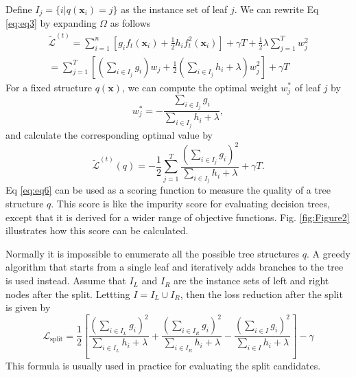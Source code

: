 \documentclass[sigconf]{acmart}
\begin{document}
Define $I_j = \{i|q(\mathbf{x}_i) = j\}$ as the instance set of leaf $j$. We
can rewrite Eq \eqref{eq:eq3} by expanding $\Omega$ as follows
\begin{equation}
    \begin{split}
        \tilde{\mathcal{L}}^{(t)} = \sum_{i=1}^{n}[g_if_t(\mathbf{x}_i) + \frac{1}{2}h_if_{t}^{2}(\mathbf{x}_i)] + \gamma T + \frac{1}{2}\lambda \sum_{j=1}^{T}w_{j}^{2} \\
        = \sum_{j=1}^{T}[(\sum_{i \in I_j}g_i)w_j + \frac{1}{2}(\sum_{i \in I_j}h_i + \lambda)w_{j}^{2}] + \gamma T
    \end{split}
    \label{eq:eq4}
\end{equation}
For a fixed structure $q(\mathbf{x})$, we can compute the optimal
weight $w_{j}^{*}$ of leaf $j$ by
\begin{equation}
    w_{j}^{*} = - \frac{\sum_{i \in I_j}g_i}{\sum_{i \in I_j}h_i + \lambda},
    \label{eq:eq5}
\end{equation}
and calculate the corresponding optimal value by
\begin{equation}
    \tilde{\mathcal{L}}^{(t)}(q) = - \frac{1}{2}\sum_{j=1}^{T}\frac{(\sum_{i \in I_j}g_i)^2}{\sum_{i \in I_j}h_i + \lambda} + \gamma T.
    \label{eq:eq6}
\end{equation}
Eq \eqref{eq:eq6} can be used as a scoring function to measure the quality of a tree structure $q$. This score is like the 
impurity score for evaluating decision trees, except that it is derived for a wider range of objective functions. Fig. 
\ref{fig:Figure2} illustrates how this score can be calculated.

Normally it is impossible to enumerate all the possible tree structures $q$. A greedy algorithm that starts from a
single leaf and iteratively adds branches to the tree is used instead. Assume that $I_L$ and $I_R$ are the instance sets of 
left and right nodes after the split. Lettting $I = I_L \cup I_R$, then the loss reduction after the split is given by
\begin{equation}
    \mathcal{L}_\text{split} = \frac{1}{2} \left[\frac{(\sum_{i \in I_L}g_i)^2}{\sum_{i \in I_L}h_i + \lambda} + \frac{(\sum_{i \in I_R}g_i)^2}{\sum_{i \in I_R}h_i + \lambda} - \frac{(\sum_{i \in I}g_i)^2}{\sum_{i \in I}h_i + \lambda}\right] - \gamma
    \label{eq:eq7}
\end{equation}
This formula is usually used in practice for evaluating the
split candidates.
\end{document}
